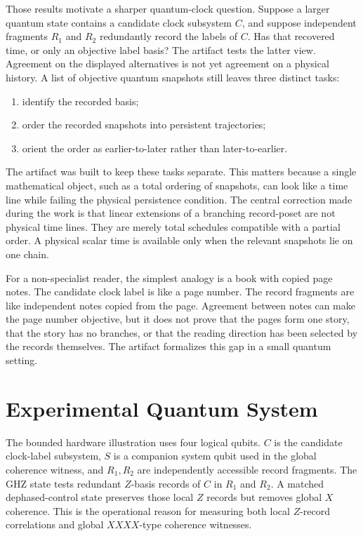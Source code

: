 \documentclass[11pt]{article}
\begin{document}
Those results motivate a sharper quantum-clock question.  Suppose a larger
quantum state contains a candidate clock subsystem \(C\), and suppose
independent fragments \(R_1\) and \(R_2\) redundantly record the labels of
\(C\).  Has that recovered time, or only an objective label basis?  The artifact
tests the latter view.  Agreement on the displayed alternatives is not yet
agreement on a physical history.  A list of objective quantum snapshots still
leaves three distinct tasks:
\begin{enumerate}
  \item identify the recorded basis;
  \item order the recorded snapshots into persistent trajectories;
  \item orient the order as earlier-to-later rather than later-to-earlier.
\end{enumerate}
The artifact was built to keep these tasks separate.  This matters because a
single mathematical object, such as a total ordering of snapshots, can look like
a time line while failing the physical persistence condition.  The central
correction made during the work is that linear extensions of a branching
record-poset are not physical time lines.  They are merely total schedules
compatible with a partial order.  A physical scalar time is available only when
the relevant snapshots lie on one chain.

For a non-specialist reader, the simplest analogy is a book with copied page
notes.  The candidate clock label is like a page number.  The record fragments
are like independent notes copied from the page.  Agreement between notes can
make the page number objective, but it does not prove that the pages form one
story, that the story has no branches, or that the reading direction has been
selected by the records themselves.  The artifact formalizes this gap in a
small quantum setting.

\section{Experimental Quantum System}

The bounded hardware illustration uses four logical qubits.  \(C\) is the
candidate clock-label subsystem, \(S\) is a companion system qubit used in the
global coherence witness, and \(R_1,R_2\) are independently accessible record
fragments.  The GHZ state tests redundant \(Z\)-basis records of \(C\) in
\(R_1\) and \(R_2\).  A matched dephased-control state preserves those local
\(Z\) records but removes global \(X\) coherence.  This is the operational
reason for measuring both local \(Z\)-record correlations and global
\(XXXX\)-type coherence witnesses.
\end{document}
